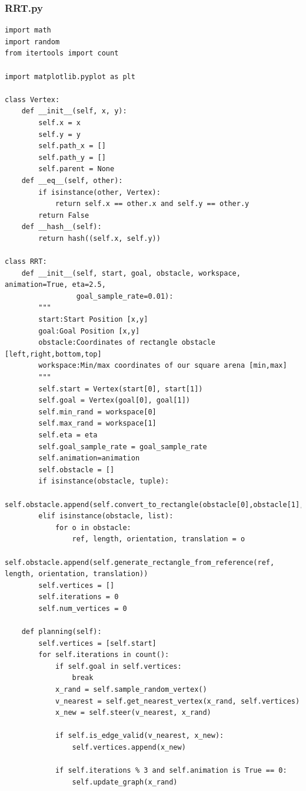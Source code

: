 \documentclass{article}
\begin{document}
\subsubsection{RRT.py}
\begin{verbatim}
import math
import random
from itertools import count

import matplotlib.pyplot as plt

class Vertex:
    def __init__(self, x, y):
        self.x = x
        self.y = y
        self.path_x = []
        self.path_y = []
        self.parent = None
    def __eq__(self, other):
        if isinstance(other, Vertex):
            return self.x == other.x and self.y == other.y
        return False
    def __hash__(self):
        return hash((self.x, self.y))

class RRT:
    def __init__(self, start, goal, obstacle, workspace, animation=True, eta=2.5,
                 goal_sample_rate=0.01):
        """
        start:Start Position [x,y]
        goal:Goal Position [x,y]
        obstacle:Coordinates of rectangle obstacle [left,right,bottom,top]
        workspace:Min/max coordinates of our square arena [min,max]
        """
        self.start = Vertex(start[0], start[1])
        self.goal = Vertex(goal[0], goal[1])
        self.min_rand = workspace[0]
        self.max_rand = workspace[1]
        self.eta = eta
        self.goal_sample_rate = goal_sample_rate
        self.animation=animation
        self.obstacle = []
        if isinstance(obstacle, tuple):
            self.obstacle.append(self.convert_to_rectangle(obstacle[0],obstacle[1],self.min_rand,self.max_rand)) 
        elif isinstance(obstacle, list):
            for o in obstacle:
                ref, length, orientation, translation = o
                self.obstacle.append(self.generate_rectangle_from_reference(ref, length, orientation, translation))
        self.vertices = []
        self.iterations = 0
        self.num_vertices = 0

    def planning(self):
        self.vertices = [self.start]
        for self.iterations in count(): 
            if self.goal in self.vertices:
                break
            x_rand = self.sample_random_vertex()
            v_nearest = self.get_nearest_vertex(x_rand, self.vertices)
            x_new = self.steer(v_nearest, x_rand)

            if self.is_edge_valid(v_nearest, x_new):
                self.vertices.append(x_new)

            if self.iterations % 3 and self.animation is True == 0:
                self.update_graph(x_rand)


\end{verbatim}
\end{document}
